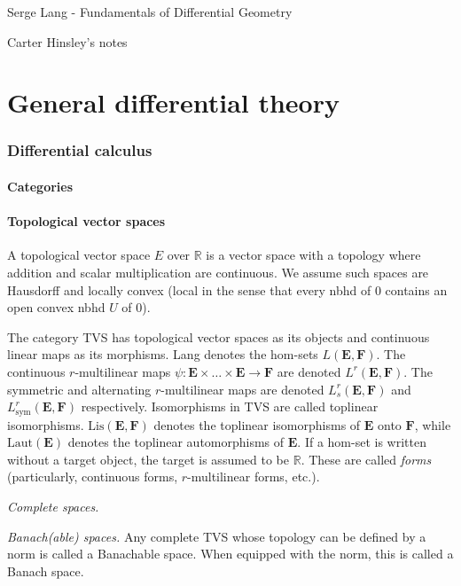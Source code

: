 \documentclass[a4paper]{article}
\newcommand{\R}{\mathbb{R}}
\begin{document}
\begin{center}
\Large{Serge Lang - Fundamentals of Differential Geometry}

\large{Carter Hinsley's notes}
\end{center}

\part{General differential theory}

\section{Differential calculus}

\subsection{Categories}

\subsection{Topological vector spaces}

A topological vector space $E$ over $\R$ is a vector space with a topology where addition and scalar multiplication are continuous. We assume such spaces are Hausdorff and locally convex (local in the sense that every nbhd of $0$ contains an open convex nbhd $U$ of $0$).

The category TVS has topological vector spaces as its objects and continuous linear maps as its morphisms. Lang denotes the hom-sets $L(\mathbf{E}, \mathbf{F})$. The continuous $r$-multilinear maps $\psi: \mathbf{E} \times \ldots \times \mathbf{E} \to \mathbf{F}$ are denoted $L^r(\mathbf{E}, \mathbf{F})$. The symmetric and alternating $r$-multilinear maps are denoted $L_s^r(\mathbf{E}, \mathbf{F})$ and $L_{\text{sym}}^r(\mathbf{E}, \mathbf{F})$ respectively. Isomorphisms in TVS are called toplinear isomorphisms. $\text{Lis}(\mathbf{E}, \mathbf{F})$ denotes the toplinear isomorphisms of $\mathbf{E}$ onto $\mathbf{F}$, while $\text{Laut}(\mathbf{E})$ denotes the toplinear automorphisms of $\mathbf{E}$. If a hom-set is written without a target object, the target is assumed to be $\R$. These are called \emph{forms} (particularly, continuous forms, $r$-multilinear forms, etc.).

\emph{Complete spaces.} 

\emph{Banach(able) spaces.} Any complete TVS whose topology can be defined by a norm is called a Banachable space. When equipped with the norm, this is called a Banach space.
\end{document}
